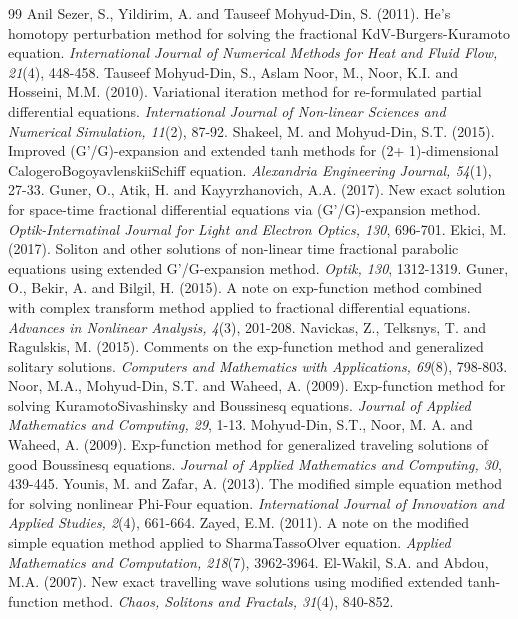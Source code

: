 \documentclass{article}
\numberwithin{equation}{section}
\begin{document}
\begin{thebibliography}{99}
Anil Sezer, S., Yildirim, A. and Tauseef Mohyud-Din, S. (2011). He's homotopy perturbation method for solving the fractional KdV-Burgers-Kuramoto equation. \emph{International Journal of Numerical Methods for Heat and Fluid Flow, 21}(4), 448-458.
Tauseef Mohyud-Din, S., Aslam Noor, M., Noor, K.I. and Hosseini, M.M. (2010). Variational iteration method for re-formulated partial differential equations. \emph{ International Journal of Non-linear Sciences and Numerical Simulation, 11}(2), 87-92.
Shakeel, M. and Mohyud-Din, S.T. (2015). Improved (G'/G)-expansion and extended tanh methods for (2+ 1)-dimensional CalogeroBogoyavlenskiiSchiff equation. \emph{Alexandria Engineering Journal, 54}(1), 27-33.
Guner, O., Atik, H. and Kayyrzhanovich, A.A. (2017). New exact solution for space-time fractional differential equations via (G'/G)-expansion method. \emph{Optik-Internatinal Journal for Light and Electron Optics, 130}, 696-701.
 Ekici, M. (2017). Soliton and other solutions of non-linear time fractional parabolic equations using extended G'/G-expansion method. \emph{Optik, 130}, 1312-1319.
Guner, O., Bekir, A. and Bilgil, H. (2015). A note on exp-function method combined with complex transform method applied to fractional differential equations. \emph{Advances in Nonlinear Analysis, 4}(3), 201-208.
Navickas, Z., Telksnys, T. and Ragulskis, M. (2015). Comments on the exp-function method and generalized solitary solutions. \emph{Computers and Mathematics with Applications, 69}(8), 798-803.
Noor, M.A., Mohyud-Din, S.T. and Waheed, A. (2009). Exp-function method for solving KuramotoSivashinsky and Boussinesq equations. \emph{Journal of Applied Mathematics and Computing, 29}, 1-13.
Mohyud-Din, S.T., Noor, M. A. and Waheed, A. (2009). Exp-function method for generalized traveling solutions of good Boussinesq equations. \emph{Journal of Applied Mathematics and Computing, 30}, 439-445.
Younis, M. and Zafar, A. (2013). The modified simple equation method for solving nonlinear Phi-Four equation. \emph{International Journal of Innovation and Applied Studies, 2}(4), 661-664.
 Zayed, E.M. (2011). A note on the modified simple equation method applied to SharmaTassoOlver equation. \emph{Applied Mathematics and Computation, 218}(7), 3962-3964.
El-Wakil, S.A. and Abdou, M.A. (2007). New exact travelling wave solutions using modified extended tanh-function method. \emph{Chaos, Solitons and Fractals, 31}(4), 840-852.

\end{thebibliography}
\end{document}
